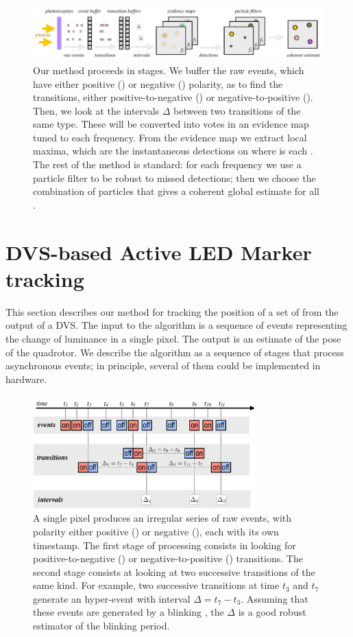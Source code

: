 \begin{figure}
\centering{}\includegraphics[width=18cm]{figures/slides/overall2}\caption{Our method proceeds in stages. We buffer the raw events, which have
either positive (\pP) or negative (\pN) polarity, as to find the
transitions, either positive-to-negative (\pPN) or negative-to-positive
(\pNP). Then, we look at the intervals $\Delta$ between two transitions
of the same type. These will be converted into votes in an evidence
map tuned to each frequency. From the evidence map we extract local
maxima, which are the instantaneous detections on where is each \ALM.
The rest of the method is standard: for each frequency we use a particle
filter to be robust to missed detections; then we choose the combination
of particles that gives a coherent global estimate for all \ALMs.}
\end{figure}


\vfill\pagebreak


\section{DVS-based Active LED Marker tracking }

This section describes our method for tracking the position of a set
of \ALMs from the output of a DVS. The input to the algorithm is
a sequence of events representing the change of luminance in a single
pixel. The output is an estimate of the pose of the quadrotor. We
describe the algorithm as a sequence of stages that process asynchronous
events; in principle, several of them could be implemented in hardware.

\begin{figure}[H]
\includegraphics[width=8.6cm]{figures/slides/stages3}

\caption{A single pixel produces an irregular series of raw events, with polarity
either positive (\pP) or negative (\pN), each with its own timestamp.
The first stage of processing consists in looking for positive-to-negative
(\pPN) or negative-to-positive (\pNP) transitions. The second stage
consists at looking at two successive transitions of the same kind.
For example, two successive \pPN transitions at time $t_{3}$ and
$t_{7}$ generate an hyper-event with interval $\Delta=t_{7}-t_{3}$.
Assuming that these events are generated by a blinking \ALM, the
$\Delta$ is a good robust estimator of the blinking period.}
\end{figure}



